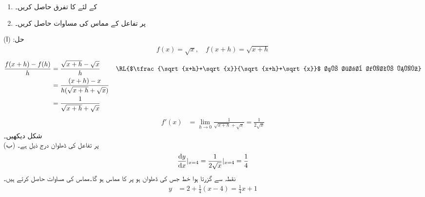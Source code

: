 \begin{enumerate}[1.]

\item
{} کے لئے  کا تفرق حاصل کریں۔
\item
{} پر تفاعل  کے مماس کی مساوات حاصل کریں۔
\end{enumerate}
حل:\quad
(ا) \quad {}\quad
\begin{align*}
f(x)=\sqrt{x},\quad f(x+h)=\sqrt{x+h}
\end{align*}
\begin{align*}
\frac{f(x+h)-f(h)}{h}&=\frac{\sqrt{x+h}-\sqrt{x}}{h}&& \text{\RL{$\tfrac{\sqrt{x+h}+\sqrt{x}}{\sqrt{x+h}+\sqrt{x}}$ سے ضرب دیتے ہیں}}\\
&=\frac{(x+h)-x}{h(\sqrt{x+h}+\sqrt{x})}\\
&=\frac{1}{\sqrt{x+h}+\sqrt{x}}
\end{align*}
\begin{align*}
f'(x)&=\lim_{h\to 0}\frac{1}{\sqrt{x+h}+\sqrt{x}}=\frac{1}{2\sqrt{x}}
\end{align*}
شکل  دیکھیں۔\\
(ب)\quad
{} پر تفاعل کی ڈھلوان درج ذیل ہے۔
\begin{align*}
\frac{\dif y}{\dif x}|_{x=4}=\frac{1}{2\sqrt{x}}|_{x=4}=\frac{1}{4}
\end{align*}
نقطہ  سے گزرتا ہوا خط جس کی ڈھلوان  ہو  پر  کا مماس ہو گا۔مماس کی مساوات حاصل کرتے ہیں۔
\begin{align*}
y&=2+\frac{1}{4}(x-4)=\frac{1}{4}x+1
\end{align*}
%
